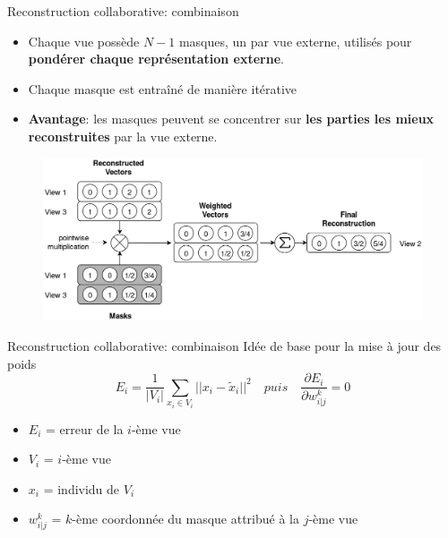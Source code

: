 \documentclass[hyperref={pdfpagelabels=false}]{beamer}
\begin{document}
    \begin{frame}{Reconstruction collaborative: combinaison}
        \begin{itemize}
            \item Chaque vue possède $N-1$ masques, un par vue externe, utilisés 
                pour \textbf{pondérer chaque représentation externe}.
            \item Chaque masque est entraîné de manière itérative
            \item \textbf{Avantage}: les masques peuvent se concentrer sur 
                \textbf{les parties les mieux reconstruites} par la vue externe.
        \end{itemize}
        \begin{figure}[b]
            \centering
            \includegraphics[scale=.17]{mwm.png}
        \end{figure}
    \end{frame}

    \begin{frame}{Reconstruction collaborative: combinaison}
        Idée de base pour la mise à jour des poids
        \begin{equation*}
             E_i = \frac{1}{|V_i|}\sum_{x_i \in V_i}||x_i - \widetilde{x}_i||^2 
             \quad puis \quad \frac{\partial E_i}{\partial w_{i|j}^k} = 0
        \end{equation*}
        \begin{itemize}
            \item $E_i$ = erreur de la $i$-ème vue
            \item $V_i$ = $i$-ème vue
            \item $x_i$ = individu de $V_i$
            \item $w_{i|j}^k$ = $k$-ème coordonnée du masque attribué à la 
                $j$-ème vue
        \end{itemize}
    \end{frame}
\end{document}
